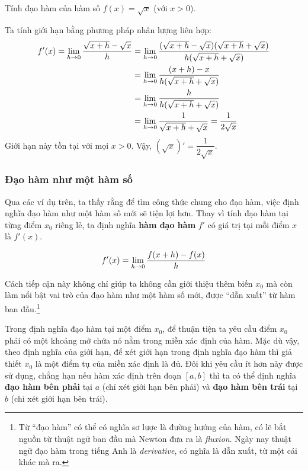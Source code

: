 \begin{example}
Tính đạo hàm của hàm số $f(x) = \sqrt{x}$ (với $x > 0$).
\end{example}
\begin{solution}
Ta tính giới hạn bằng phương pháp nhân lượng liên hợp:
\begin{align*}
f'(x) = \lim\limits_{h \to 0} \dfrac{\sqrt{x+h} - \sqrt{x}}{h} &= \lim\limits_{h \to 0} \dfrac{(\sqrt{x+h} - \sqrt{x})(\sqrt{x+h} + \sqrt{x})}{h(\sqrt{x+h} + \sqrt{x})} \\
&= \lim\limits_{h \to 0} \dfrac{(x+h) - x}{h(\sqrt{x+h} + \sqrt{x})} \\
&= \lim\limits_{h \to 0} \dfrac{h}{h(\sqrt{x+h} + \sqrt{x})} \\
&= \lim\limits_{h \to 0} \dfrac{1}{\sqrt{x+h} + \sqrt{x}} = \dfrac{1}{2\sqrt{x}}
\end{align*}
Giới hạn này tồn tại với mọi $x > 0$. Vậy, $(\sqrt{x})' = \dfrac{1}{2\sqrt{x}}$.
\end{solution}

\subsubsection{Đạo hàm như một hàm số}

Qua các ví dụ trên, ta thấy rằng để tìm công thức chung cho đạo hàm, việc định nghĩa đạo hàm như một hàm số mới sẽ tiện lợi hơn. Thay vì tính đạo hàm tại từng điểm $x_0$ riêng lẻ, ta định nghĩa \textbf{hàm đạo hàm} $f'$ có giá trị tại mỗi điểm $x$ là $f'(x)$.

\begin{tcolorbox}[colback=yellow!10!white, colframe=blue!75!black, fonttitle=\bfseries, boxrule=0.5pt, arc=2mm]
$$
f'(x) = \lim\limits_{h \to 0} \dfrac{f(x+h) - f(x)}{h}
$$
\end{tcolorbox}

Cách tiếp cận này không chỉ giúp ta không cần giới thiệu thêm biến $x_0$ mà còn làm nổi bật vai trò của đạo hàm như một hàm số mới, được ``dẫn xuất'' từ hàm ban đầu.\footnote{Từ ``đạo hàm'' có thể có nghĩa sơ lược là đường hướng của hàm, có lẽ bắt nguồn từ thuật ngữ ban đầu mà Newton đưa ra là \textit{fluxion}. Ngày nay thuật ngữ đạo hàm trong tiếng Anh là \textit{derivative}, có nghĩa là dẫn xuất, từ một cái khác mà ra.}

Trong định nghĩa đạo hàm tại một điểm $x_0$, để thuận tiện ta yêu cầu điểm $x_0$ phải có một khoảng mở chứa nó nằm trong miền xác định của hàm. Mặc dù vậy, theo định nghĩa của giới hạn, để xét giới hạn trong định nghĩa đạo hàm thì giả thiết $x_0$ là một điểm tụ của miền xác định là đủ. Đôi khi yêu cầu ít hơn này được sử dụng, chẳng hạn nếu hàm xác định trên đoạn $[a, b]$ thì ta có thể định nghĩa \textbf{đạo hàm bên phải} tại $a$ (chỉ xét giới hạn bên phải) và \textbf{đạo hàm bên trái} tại $b$ (chỉ xét giới hạn bên trái).

